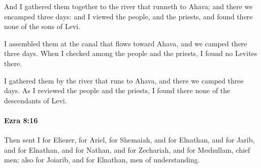 			\begin{versebox}
					\item[BHS] 
					\item[LXX] 
					\item[ASV] And I gathered them together to the river that runneth to Ahava; and there we encamped three days: and I viewed the people, and the priests, and found there none of the sons of Levi.
					\item[NIV] I assembled them at the canal that flows toward Ahava, and we camped there three days. When I checked among the people and the priests, I found no Levites there.
					\item[NRSV] I gathered them by the river that runs to Ahava, and there we camped three days. As I reviewed the people and the priests, I found there none of the descendants of Levi.
			\end{versebox}

		\paragraph{Ezra 8:16} %
			\label{EZRA-8-16}

			Then sent I for Eliezer, for Ariel, for Shemaiah, and for Elnathan, and for Jarib, and for Elnathan, and for Nathan, and for Zechariah, and for Meshullam, chief men; also for Joiarib, and for Elnathan, men of understanding.

